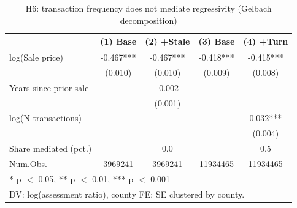\begin{table}
\centering
\caption{H6: transaction frequency does not mediate regressivity (Gelbach decomposition)}\label{tab:h6}
\centering
\begin{tabular}[t]{lcccc}
\toprule
  & (1) Base & (2) +Stale & (3) Base & (4) +Turn\\
\midrule
log(Sale price) & -0.467*** & -0.467*** & -0.418*** & -0.415***\\
 & (0.010) & (0.010) & (0.009) & (0.008)\\
Years since prior sale &  & -0.002 &  & \\
 &  & (0.001) &  & \\
log(N transactions) &  &  &  & 0.032***\\
 &  &  &  & (0.004)\\
\midrule
Share mediated (pct.) &  & 0.0 &  & 0.5\\
Num.Obs. & 3969241 & 3969241 & 11934465 & 11934465\\
\bottomrule
\multicolumn{5}{l}{\rule{0pt}{1em}* p $<$ 0.05, ** p $<$ 0.01, *** p $<$ 0.001}\\
\multicolumn{5}{l}{\rule{0pt}{1em}DV: log(assessment ratio), county FE; SE clustered by county.}\\
\end{tabular}
\end{table}
